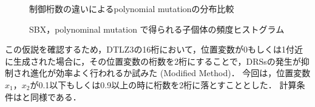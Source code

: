 \documentclass[../main/main]{subfiles}
\begin{document}
\begin{description}
\begin{figure}[htbp]
\begin{center}
{\label{dtlz2::b}
}
\end{center}
\setlength{\abovecaptionskip}{0mm}
\setlength{\belowcaptionskip}{0mm}
\caption{制御桁数の違いによるpolynomial mutationの分布比較}
\label{mutation}
\end{figure}
\begin{figure}[H]
\begin{center}
\end{center}
\setlength{\abovecaptionskip}{0mm}
\setlength{\belowcaptionskip}{0mm}
\caption{SBX，polynominal mutation で得られる子個体の頻度ヒストグラム}
\label{hist}
\end{figure}

\afterpage{\clearpage}

\quad この仮説を確認するため，DTLZ3の16桁において，位置変数が0もしくは1付近に生成された場合に，その位置変数の桁数を2桁にすることで，DRSsの発生が抑制され進化が効率よく行われるか試みた (Modified Method)．
今回は，位置変数$x_1$，$x_2$が0.1以下もしくは0.9以上の時に桁数を2桁に落とすこととした．
計算条件はと同様である．


\end{description}
\end{document}
